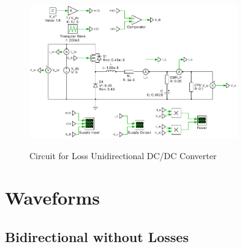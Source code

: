 \documentclass{article}
\begin{document}
\begin{figure}[H]
    \centering{}
    \includegraphics[width=0.8\textwidth]{img/loss-unidirectional.pdf}
    \label{fig:loss-uni-circuit}
    \caption{Circuit for Loss Unidirectional DC/DC Converter}
\end{figure}

\section{Waveforms}

\subsection{Bidirectional without Losses}
\end{document}
